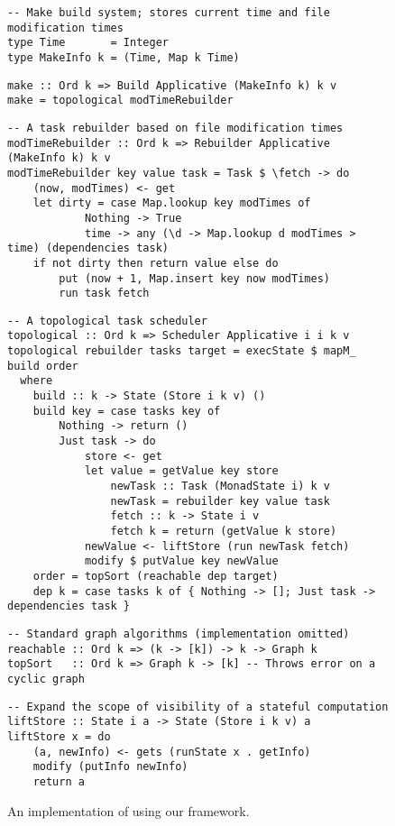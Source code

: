 \begin{figure}
\begin{verbatim}
-- Make build system; stores current time and file modification times
type Time       = Integer
type MakeInfo k = (Time, Map k Time)
\end{verbatim}
\vspace{0mm}
\begin{verbatim}
make :: Ord k => Build Applicative (MakeInfo k) k v
make = topological modTimeRebuilder
\end{verbatim}
\vspace{0mm}
\begin{verbatim}
-- A task rebuilder based on file modification times
modTimeRebuilder :: Ord k => Rebuilder Applicative (MakeInfo k) k v
modTimeRebuilder key value task = Task $ \fetch -> do
    (now, modTimes) <- get
    let dirty = case Map.lookup key modTimes of
            Nothing -> True
            time -> any (\d -> Map.lookup d modTimes > time) (dependencies task)
    if not dirty then return value else do
        put (now + 1, Map.insert key now modTimes)
        run task fetch
\end{verbatim}
\vspace{0mm}
\begin{verbatim}
-- A topological task scheduler
topological :: Ord k => Scheduler Applicative i i k v
topological rebuilder tasks target = execState $ mapM_ build order
  where
    build :: k -> State (Store i k v) ()
    build key = case tasks key of
        Nothing -> return ()
        Just task -> do
            store <- get
            let value = getValue key store
                newTask :: Task (MonadState i) k v
                newTask = rebuilder key value task
                fetch :: k -> State i v
                fetch k = return (getValue k store)
            newValue <- liftStore (run newTask fetch)
            modify $ putValue key newValue
    order = topSort (reachable dep target)
    dep k = case tasks k of { Nothing -> []; Just task -> dependencies task }
\end{verbatim}
\vspace{0mm}
\begin{verbatim}
-- Standard graph algorithms (implementation omitted)
reachable :: Ord k => (k -> [k]) -> k -> Graph k
topSort   :: Ord k => Graph k -> [k] -- Throws error on a cyclic graph
\end{verbatim}
\vspace{0mm}
\begin{verbatim}
-- Expand the scope of visibility of a stateful computation
liftStore :: State i a -> State (Store i k v) a
liftStore x = do
    (a, newInfo) <- gets (runState x . getInfo)
    modify (putInfo newInfo)
    return a
\end{verbatim}
\caption{An implementation of \Make using our framework.}\label{fig-make-implementation}
\end{figure}

